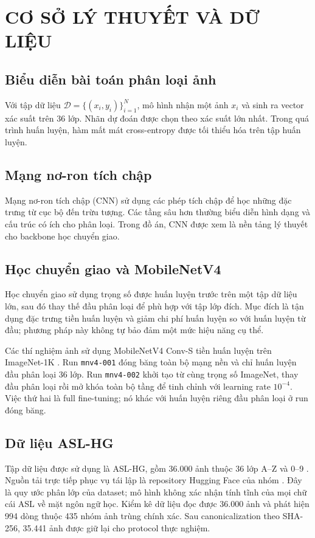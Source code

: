 \chapter{CƠ SỞ LÝ THUYẾT VÀ DỮ LIỆU}

\section{Biểu diễn bài toán phân loại ảnh}
Với tập dữ liệu $\mathcal{D}=\{(x_i,y_i)\}_{i=1}^{N}$, mô hình nhận một ảnh $x_i$ và sinh ra vector xác suất trên 36 lớp. Nhãn dự đoán được chọn theo xác suất lớn nhất. Trong quá trình huấn luyện, hàm mất mát cross-entropy được tối thiểu hóa trên tập huấn luyện.

\section{Mạng nơ-ron tích chập}
Mạng nơ-ron tích chập (CNN) sử dụng các phép tích chập để học những đặc trưng từ cục bộ đến trừu tượng. Các tầng sâu hơn thường biểu diễn hình dạng và cấu trúc có ích cho phân loại. Trong đồ án, CNN được xem là nền tảng lý thuyết cho backbone học chuyển giao.

\section{Học chuyển giao và MobileNetV4}
Học chuyển giao sử dụng trọng số được huấn luyện trước trên một tập dữ liệu lớn, sau đó thay thế đầu phân loại để phù hợp với tập lớp đích. Mục đích là tận dụng đặc trưng tiền huấn luyện và giảm chi phí huấn luyện so với huấn luyện từ đầu; phương pháp này không tự bảo đảm một mức hiệu năng cụ thể.

Các thí nghiệm ảnh sử dụng MobileNetV4 Conv-S tiền huấn luyện trên ImageNet-1K \cite{mobilenetv4}. Run \texttt{mnv4-001} đóng băng toàn bộ mạng nền và chỉ huấn luyện đầu phân loại 36 lớp. Run \texttt{mnv4-002} khởi tạo từ cùng trọng số ImageNet, thay đầu phân loại rồi mở khóa toàn bộ tầng để tinh chỉnh với learning rate $10^{-4}$. Việc thứ hai là full fine-tuning; nó khác với huấn luyện riêng đầu phân loại ở run đóng băng.

\section{Dữ liệu ASL-HG}
Tập dữ liệu được sử dụng là ASL-HG, gồm 36.000 ảnh thuộc 36 lớp A--Z và 0--9 \cite{asl-hg-original}. Nguồn tải trực tiếp phục vụ tái lập là repository Hugging Face của nhóm \cite{asl-hg-repo}. Đây là quy ước phân lớp của dataset; mô hình không xác nhận tính tĩnh của mọi chữ cái ASL về mặt ngôn ngữ học. Kiểm kê dữ liệu đọc được 36.000 ảnh và phát hiện 994 dòng thuộc 435 nhóm ảnh trùng chính xác. Sau canonicalization theo SHA-256, 35.441 ảnh được giữ lại cho protocol thực nghiệm.


